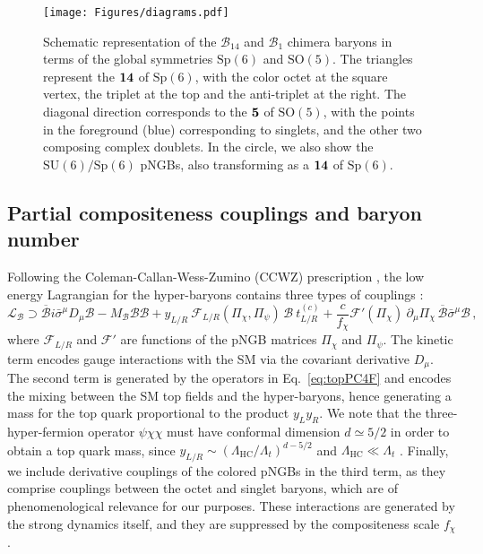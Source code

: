 \documentclass[preprintnumbers,nofootinbib,showpacs,eqsecnum,pre,12pt]{revtex4-1}
\newcommand{\SO}{\text{SO}}
\newcommand{\SU}{\text{SU}}
\newcommand{\Sp}{\text{Sp}}
\begin{document}
 \begin{figure}[tb]
	\centering
	\texttt{[image: Figures/diagrams.pdf]}
	\caption{Schematic representation of the $\mathcal{B}_{14}$ and $\mathcal{B}_1$ chimera baryons  in terms of the global symmetries $\Sp(6)$ and $\SO(5)$. The triangles represent the $\bf 14$ of $\Sp(6)$, with the color octet at the square vertex, the triplet at the top and the anti-triplet at the right. The diagonal direction corresponds to the $\bf 5$ of $\SO(5)$, with the points in the foreground (blue) corresponding to singlets, and the other two composing complex doublets. In the circle, we also show the $\SU(6)/\Sp(6)$ pNGBs, also transforming as a $\bf 14$ of $\Sp(6)$.}
	\label{fig:diagrams}
\end{figure}


\subsection{Partial compositeness couplings and baryon number}


Following the Coleman-Callan-Wess-Zumino (CCWZ) prescription \cite{Coleman:1969sm,Callan:1969sn}, the low energy Lagrangian for the hyper-baryons contains three types of couplings \cite{Marzocca:2012zn}:
\begin{equation} \label{eq:LagB}
    \mathcal{L}_{\mathcal{B}} \supset  \overline{\mathcal{B}} i \bar{\sigma}^\mu D_\mu \mathcal{B} - M_\mathcal{B} \mathcal{B} \mathcal{B} + y_{L/R}\ \mathcal{F}_{L/R} (\Pi_\chi, \Pi_\psi)\, \mathcal{B}\ t_{L/R}^{(c)} + \frac{c}{f_\chi} \mathcal{F}' (\Pi_\chi)\ \partial_\mu \Pi_\chi\, \overline{\mathcal{B}} \bar{\sigma}^\mu \mathcal{B}\,,
\end{equation}
where $\mathcal{F}_{L/R}$ and $\mathcal{F}'$ are functions of the pNGB matrices $\Pi_\chi$ and $\Pi_\psi$. The kinetic term encodes gauge interactions with the SM via the covariant derivative $D_\mu$. The second term is generated by the operators in Eq.~\eqref{eq:topPC4F} and encodes the mixing between the SM top fields and the hyper-baryons, hence generating a mass for the top quark proportional to the product $y_L y_R$. 
We note that the three-hyper-fermion operator $\psi\chi\chi$ must have conformal dimension $d\simeq 5/2$ in order to obtain a top quark mass, since $y_{L/R} \sim (\Lambda_\mathrm{HC}/\Lambda_t)^{d-5/2}$ and $\Lambda_\mathrm{HC} \ll \Lambda_t$ \cite{Panico:2015jxa}.
Finally, we include derivative couplings of the colored pNGBs in the third term, as they comprise couplings between the octet and singlet baryons, which are of phenomenological relevance for our purposes. These interactions are generated by the strong dynamics itself, and they are suppressed by the compositeness scale $f_\chi$.
\end{document}
